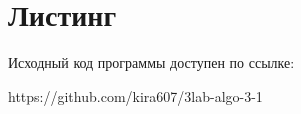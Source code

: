 \section*{Листинг}

Исходный код программы доступен по ссылке: 

https://github.com/kira607/3lab-algo-3-1